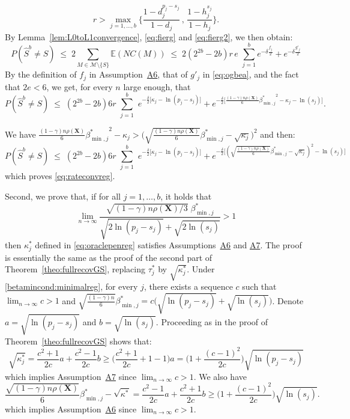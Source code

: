\documentclass[bj,authoryear]{imsart}
\theoremstyle{plain}
\newcommand{\E}{\mathbb{E}}
\newcommand{\M}{\mathcal{M}}
\newcommand{\bs}{\boldsymbol}
\begin{document}
\begin{equation} \label{eq:fierg2}r>\max_{j=1,\ldots,b}\bigg\{\frac{1-d_j^{p_j-s_j}}{1-d_j} \,,\,\frac{1-h_j^{s_j}}{1-h_j} \bigg\}.\end{equation} 
 By Lemma~\ref{lem:L0toL1convergence}, \eqref{eq:fierg} and \eqref{eq:fierg2}, we then obtain:
$$P(\hat{S}^{b} \neq S)\;\leq\;  2 \sum_{M \in \M\setminus \{S\}} \E\left(NC(M)\right)
     \;\leq\; 2 (2^{2b}-2b) r\,e\,\,\sum_{j=1}^b e^{-\delta \tfrac{f_j}{2}} +e^{-\delta \tfrac{g'_j}{2}}$$
By the definition of $f_j$ in Assumption~\hyperlink{lab:A6}{A6}, that of $g'_j$ in \eqref{eq:ogbea}, and the fact that $2e<6$,  we get, for every $n$ large enough, that
\begin{equation}\label{eq:gpkr}
    P(\hat{S}^{b} \neq S)\;\leq\; (2^{2b}-2b)6r\,\,\sum_{j=1}^b\,\, e^{-\tfrac{\delta}{2}\big[\kappa_j-\ln(p_j-s_j)\big]} + e^{-\tfrac{\delta}{2}\big[\frac{(1-\gamma) n\rho(\bs X)}{6}{\beta_{\min,j}^*}^2 - \kappa_j -\ln(s_j) \big]}.
\end{equation}

We have $\frac{(1-\gamma) n\rho(\bs X)}{6}{\beta_{\min,j}^*}^2 - \kappa_j > \Big(\sqrt{\frac{(1-\gamma) n\rho(\bs X)}{6}}{\beta_{\min,j}^*} - \sqrt{\kappa_j}\Big)^2$ and then:
$$P(\hat{S}^{b} \neq S)\;\leq\; (2^{2b}-2b)6r\,\,\sum_{j=1}^b\,\, e^{-\tfrac{\delta}{2}\big[\kappa_j-\ln(p_j-s_j)\big]} + e^{-\tfrac{\delta}{2}\big[(\sqrt{\frac{(1-\gamma) n\rho(\bs X)}{6}}{\beta_{\min,j}^*} - \sqrt{\kappa_j})^2 -\ln(s_j) \big]}
$$
which proves \eqref{eq:rateconvreg}. 

Second, we prove that, if for all $j=1,\ldots,b$, it holds that
\begin{equation}\label{betamincond:minimalreg}
    \lim_{n\to \infty}\frac{\sqrt{(1-\gamma) n\rho(\bs X)/3}\;\beta_{\min,j}^*}{\sqrt{2\ln(p_j-s_j)} + \sqrt{2\ln(s_j)}} >1
\end{equation}
then $\kappa^*_j$ defined in \eqref{eq:oraclepenreg} satisfies Assumptions~\hyperlink{lab:A6}{A6} and \hyperlink{lab:A7}{A7}. The proof is essentially the same as the proof of the second part of Theorem~\ref{theo:fullrecovGS}, replacing $\tau^*_j$ by $\sqrt{\kappa^*_j}$.  Under \eqref{betamincond:minimalreg}, for every $j$, there exists a sequence $c$ such that $\lim_{n\to\infty} c>1$ and $\sqrt{\frac{(1-\gamma)n}{6}}\beta^*_{\min,j}=c\big(\sqrt{\ln(p_j-s_j)} + \sqrt{\ln(s_j)}\big)$. Denote $a=\sqrt{\ln(p_j-s_j)}$ and $b=\sqrt{\ln(s_j)}$. Proceeding as in the proof of Theorem~\ref{theo:fullrecovGS} shows that:
\begin{equation*}
\sqrt{\kappa^*_j} =\frac{c^2+1}{2c}a+\frac{c^2-1}{2c}b  \geq  \Big(\frac{c^2+1}{2c}+1-1\Big)a = \Big(1+\frac{(c-1)^2}{2c}\Big)\sqrt{\ln(p_j-s_j)} 
\end{equation*}
which implies Assumption~\hyperlink{lab:A7}{A7} since $\lim_{n\to\infty} c>1$. We also have
\begin{equation*}
\frac{\sqrt{(1-\gamma) n\rho(\bs X)}}{6}{\beta_{\min,j}^*}-\sqrt{\kappa^*} = \frac{c^2-1}{2c}a+\frac{c^2+1}{2c}b \geq \Big(1+\frac{(c-1)^2}{2c}\Big)\sqrt{\ln(s_j)}.
\end{equation*}
which implies Assumption~\hyperlink{lab:A6}{A6} since $\lim_{n\to\infty} c>1$.
\end{document}
